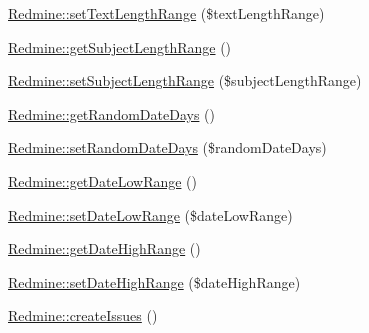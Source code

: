 \begin{DoxyCompactItemize}
\item 
\mbox{\hyperlink{namespace_redmine_a5299e7080bf42493da226265e4ffc1e9}{Redmine\+::set\+Text\+Length\+Range}} (\$text\+Length\+Range)
\item 
\mbox{\hyperlink{namespace_redmine_a1c2727f393a7ea6c7454e27ba0696c79}{Redmine\+::get\+Subject\+Length\+Range}} ()
\item 
\mbox{\hyperlink{namespace_redmine_a44b28604b182ba8a297f3beebb193308}{Redmine\+::set\+Subject\+Length\+Range}} (\$subject\+Length\+Range)
\item 
\mbox{\hyperlink{namespace_redmine_a64d7ae5ab4f6b01330e93a2eb33c7325}{Redmine\+::get\+Random\+Date\+Days}} ()
\item 
\mbox{\hyperlink{namespace_redmine_a05fb08644d408e8f560d21a03c497c88}{Redmine\+::set\+Random\+Date\+Days}} (\$random\+Date\+Days)
\item 
\mbox{\hyperlink{namespace_redmine_aeb2a8ae7b82a8383551d30e21314931c}{Redmine\+::get\+Date\+Low\+Range}} ()
\item 
\mbox{\hyperlink{namespace_redmine_a812c5158d9c81670071e1924a0d1ad2b}{Redmine\+::set\+Date\+Low\+Range}} (\$date\+Low\+Range)
\item 
\mbox{\hyperlink{namespace_redmine_aae8f12afa6eb411d71171213f322e09b}{Redmine\+::get\+Date\+High\+Range}} ()
\item 
\mbox{\hyperlink{namespace_redmine_a1d899af81d907eb89afa797842fe7db3}{Redmine\+::set\+Date\+High\+Range}} (\$date\+High\+Range)
\item 
\mbox{\hyperlink{namespace_redmine_a045be2207229835f92d397ee3e31f0e6}{Redmine\+::create\+Issues}} ()
\end{DoxyCompactItemize}
